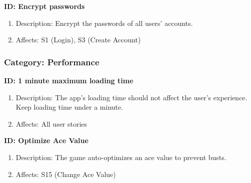 \smallskip

\textbf{ID: Encrypt passwords}
\begin{enumerate}
    \item Description: Encrypt the passwords of all users' accounts.
    \item Affects: S1 (Login), S3 (Create Account)
\end{enumerate}

\subsubsection{Category: Performance}

\textbf{ID: 1 minute maximum loading time}
\begin{enumerate}
    \item Description: The app's loading time should not affect the user's experience. Keep loading time under a minute.
    \item Affects: All user stories
\end{enumerate}

\smallskip

\textbf{ID: Optimize Ace Value}
\begin{enumerate}
    \item Description: The game auto-optimizes an ace value to prevent busts.
    \item Affects: S15 (Change Ace Value)
\end{enumerate}

